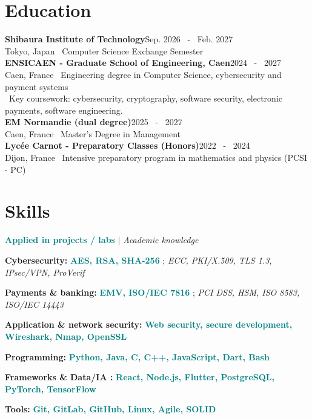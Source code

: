 \documentclass[10pt,a4paper]{article}
\newcommand{\sm}[1]{{\fontsize{8.5}{10.2}\selectfont #1}}
\begin{document}
\section{Education}
\sm{\textbf{Shibaura Institute of Technology}\hfill\textcolor{muted}{Sep. 2026 \ - \ Feb. 2027}\\
\textcolor{muted}{Tokyo, Japan \textbar\ Computer Science Exchange Semester}\\[3pt]
\textbf{ENSICAEN - Graduate School of Engineering, Caen}\hfill\textcolor{muted}{2024 \ - \ 2027}\\
\textcolor{muted}{Caen, France \textbar\ Engineering degree in Computer Science, cybersecurity and payment systems}\\[-1pt]
\textbullet\ Key coursework: cybersecurity, cryptography, software security, electronic payments, software engineering.\\[3pt]
\textbf{EM Normandie (dual degree)}\hfill\textcolor{muted}{2025 \ - \ 2027}\\
\textcolor{muted}{Caen, France \textbar\ Master's Degree in Management}\\[3pt]
\textbf{Lycée Carnot - Preparatory Classes (Honors)}\hfill\textcolor{muted}{2022 \ - \ 2024}\\
\textcolor{muted}{Dijon, France \textbar\ Intensive preparatory program in mathematics and physics (PCSI - PC)}}

\section{Skills}
{\fontsize{7.85}{9.7}\selectfont
\textcolor{teal}{\textbf{Applied in projects / labs}} \quad | \quad \textcolor{muted}{\textit{Academic knowledge}}\par\vspace{4pt}
\textbf{Cybersecurity:} \textcolor{teal}{\textbf{AES, RSA, SHA-256}} ; \textcolor{muted}{\textit{ECC, PKI/X.509, TLS 1.3, IPsec/VPN, ProVerif}}\par\vspace{2pt}
\textbf{Payments \& banking:} \textcolor{teal}{\textbf{EMV, ISO/IEC 7816}} ; \textcolor{muted}{\textit{PCI DSS, HSM, ISO 8583, ISO/IEC 14443}}\par\vspace{2pt}
\textbf{Application \& network security:} \textcolor{teal}{\textbf{Web security, secure development, Wireshark, Nmap, OpenSSL}}\par\vspace{2pt}
\textbf{Programming:} \textcolor{teal}{\textbf{Python, Java, C, C++, JavaScript, Dart, Bash}}\par\vspace{2pt}
\textbf{Frameworks \& Data/IA :} \textcolor{teal}{\textbf{React, Node.js, Flutter, PostgreSQL, PyTorch, TensorFlow}}\par\vspace{2pt}
\textbf{Tools:} \textcolor{teal}{\textbf{Git, GitLab, GitHub, Linux, Agile, SOLID}}
}
\end{document}
